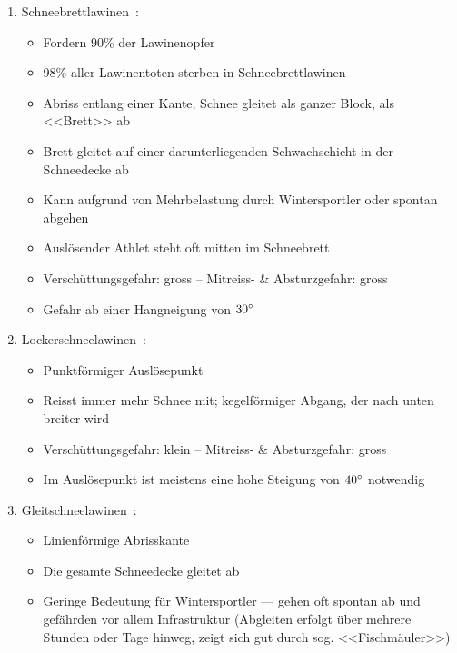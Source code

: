 \begin{enumerate}
  \item Schneebrettlawinen~\cite{harveyrhynerschweizerlawinenkunde}\cite{sacbergspwinter}\cite{slfLawinentypen}\cite{ortovoxlabsnow}:
  \begin{itemize}
    \item Fordern 90\% der Lawinenopfer
    \item 98\% aller Lawinentoten sterben in Schneebrettlawinen
    \item Abriss entlang einer Kante, Schnee gleitet als ganzer Block, als <<Brett>> ab
    \item Brett gleitet auf einer darunterliegenden Schwachschicht in der Schneedecke ab
    \item Kann aufgrund von Mehrbelastung durch Wintersportler oder spontan abgehen
    \item Auslösender Athlet steht oft mitten im Schneebrett
    \item Verschüttungsgefahr: gross – Mitreiss- \& Absturzgefahr: gross
    \item Gefahr ab einer Hangneigung von $30\degree$
  \end{itemize}
    
  \item Lockerschneelawinen~\cite{harveyrhynerschweizerlawinenkunde}\cite{sacbergspwinter}\cite{slfLawinentypen}:
  \begin{itemize}
    \item Punktförmiger Auslösepunkt
    \item Reisst immer mehr Schnee mit; kegelförmiger Abgang, der nach unten breiter wird
    \item Verschüttungsgefahr: klein – Mitreiss- \& Absturzgefahr: gross
    \item Im Auslösepunkt ist meistens eine hohe Steigung von $40\degree$ notwendig
  \end{itemize}

  \item Gleitschneelawinen~\cite{harveyrhynerschweizerlawinenkunde}\cite{sacbergspwinter}\cite{slfLawinentypen}:
  \begin{itemize}
    \item Linienförmige Abrisskante
    \item Die gesamte Schneedecke gleitet ab
    \item Geringe Bedeutung für Wintersportler –-- gehen oft spontan ab und gefährden vor allem Infrastruktur (Abgleiten erfolgt über mehrere Stunden oder Tage hinweg, zeigt sich gut durch sog. <<Fischmäuler>>)
  \end{itemize}
\end{enumerate}
